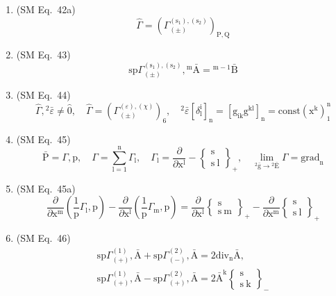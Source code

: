 \documentclass[12pt]{article}
\begin{document}
\begin{enumerate}[label=(\arabic*), series=formellist]
    \item (SM Eq.\ 42a) 
    \[
    \widehat{\Gamma} = \left( \Gamma^{(\mathrm{s}_1), (\mathrm{s}_2)}_{(\pm)} \right)_{\mathrm{P,Q}}
    \]

    \item (SM Eq.\ 43) 
    \[
    \mathrm{sp} \Gamma^{(\mathrm{s}_1), (\mathrm{s}_2)}_{(\pm)}, {}^\mathrm{m}\bar{\mathrm{A}} = {}^{\mathrm{m}-1}\bar{\mathrm{B}}
    \]

    \item (SM Eq.\ 44) 
    \[
    \widehat{\Gamma}, {}^2\bar{\varepsilon} \ne \hat{0}, \quad \widehat{\Gamma} = \left( \Gamma^{(\varepsilon), (\chi)}_{(\pm)} \right)_6, \quad {}^2\bar{\varepsilon} \left[ \delta_\mathrm{l}^\mathrm{i} \right]_\mathrm{n} = \left[ \mathrm{g}_{\mathrm{ik}}\mathrm{g}^{\mathrm{kl}} \right]_\mathrm{n} = \mathrm{const} \left( \mathrm{x^k} \right)_1^\mathrm{n}
    \]

    \item (SM Eq.\ 45) 
    \[
    \bar{\mathrm{P}} = \Gamma, \mathrm{p}, \quad \Gamma = \sum_{\mathrm{l}=1}^\mathrm{n} \Gamma_\mathrm{l}, \quad \Gamma_\mathrm{l} = \frac{\partial}{\partial \mathrm{x^l}} - \left\{ \begin{smallmatrix} \mathrm{s} \\ \mathrm{s\ l} \end{smallmatrix} \right\}_+, \quad \lim_{{}^2\bar{\mathrm{g}} \to {}^2\bar{\mathrm{E}}} \Gamma = \mathrm{grad}_\mathrm{n}
    \]

    \item (SM Eq.\ 45a) 
    \[
    \frac{\partial}{\partial \mathrm{x^m}} \left( \frac{1}{\mathrm{p}} \Gamma_\mathrm{l}, \mathrm{p} \right) - \frac{\partial}{\partial \mathrm{x^l}} \left( \frac{1}{\mathrm{p}} \Gamma_\mathrm{m}, \mathrm{p} \right) = \frac{\partial}{\partial \mathrm{x^l}} \left\{ \begin{smallmatrix} \mathrm{s} \\ \mathrm{s\ m} \end{smallmatrix} \right\}_+ - \frac{\partial}{\partial \mathrm{x^m}} \left\{ \begin{smallmatrix} \mathrm{s} \\ \mathrm{s\ l} \end{smallmatrix} \right\}_+
    \]

    \item (SM Eq.\ 46) 
    \[
    \begin{gathered}
    \mathrm{sp} \Gamma^{(1)}_{(+)}, \bar{\mathrm{A}} + \mathrm{sp} \Gamma^{(2)}_{(-)}, \bar{\mathrm{A}} = 2 \mathrm{div}_\mathrm{n} \bar{\mathrm{A}}, \\
    \mathrm{sp} \Gamma^{(1)}_{(+)}, \bar{\mathrm{A}} - \mathrm{sp} \Gamma^{(2)}_{(+)}, \bar{\mathrm{A}} = 2 \bar{\mathrm{A}}^\mathrm{k} \left\{ \begin{smallmatrix} \mathrm{s} \\ \mathrm{s\ k} \end{smallmatrix} \right\}_-
    \end{gathered}
    \]


\end{enumerate}
\end{document}
